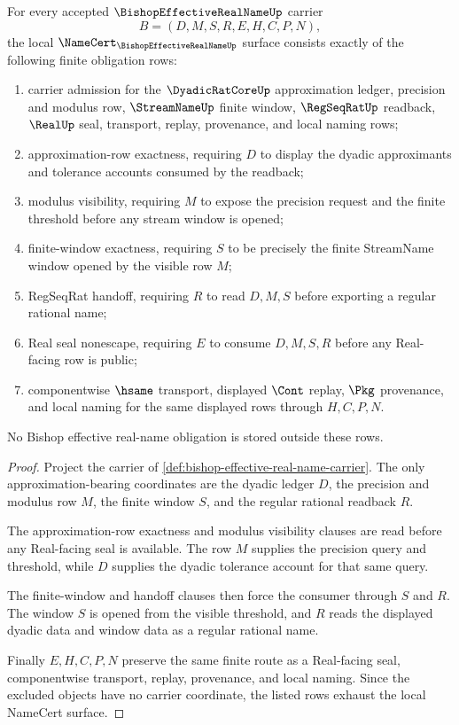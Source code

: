 \begin{theorem}
\label{thm:bishop-effective-real-name-namecert-obligations}
For every accepted $\BishopEffectiveRealNameUp$ carrier
$$
B=(D,M,S,R,E,H,C,P,N),
$$
the local $\NameCert_{\BishopEffectiveRealNameUp}$ surface consists exactly of the following finite obligation rows:
\begin{enumerate}
\item carrier admission for the $\DyadicRatCoreUp$ approximation ledger, precision and modulus row, $\StreamNameUp$ finite window, $\RegSeqRatUp$ readback, $\RealUp$ seal, transport, replay, provenance, and local naming rows;
\item approximation-row exactness, requiring $D$ to display the dyadic approximants and tolerance accounts consumed by the readback;
\item modulus visibility, requiring $M$ to expose the precision request and the finite threshold before any stream window is opened;
\item finite-window exactness, requiring $S$ to be precisely the finite StreamName window opened by the visible row $M$;
\item RegSeqRat handoff, requiring $R$ to read $D,M,S$ before exporting a regular rational name;
\item Real seal nonescape, requiring $E$ to consume $D,M,S,R$ before any Real-facing row is public;
\item componentwise $\hsame$ transport, displayed $\Cont$ replay, $\Pkg$ provenance, and local naming for the same displayed rows through $H,C,P,N$.
\end{enumerate}
No Bishop effective real-name obligation is stored outside these rows.
\end{theorem}
\begin{proof}
Project the carrier of \autoref{def:bishop-effective-real-name-carrier}. The only approximation-bearing coordinates are the dyadic ledger $D$, the precision and modulus row $M$, the finite window $S$, and the regular rational readback $R$.

The approximation-row exactness and modulus visibility clauses are read before any Real-facing seal is available. The row $M$ supplies the precision query and threshold, while $D$ supplies the dyadic tolerance account for that same query.

The finite-window and handoff clauses then force the consumer through $S$ and $R$. The window $S$ is opened from the visible threshold, and $R$ reads the displayed dyadic data and window data as a regular rational name.

Finally $E,H,C,P,N$ preserve the same finite route as a Real-facing seal, componentwise transport, replay, provenance, and local naming. Since the excluded objects have no carrier coordinate, the listed rows exhaust the local NameCert surface.
\end{proof}

